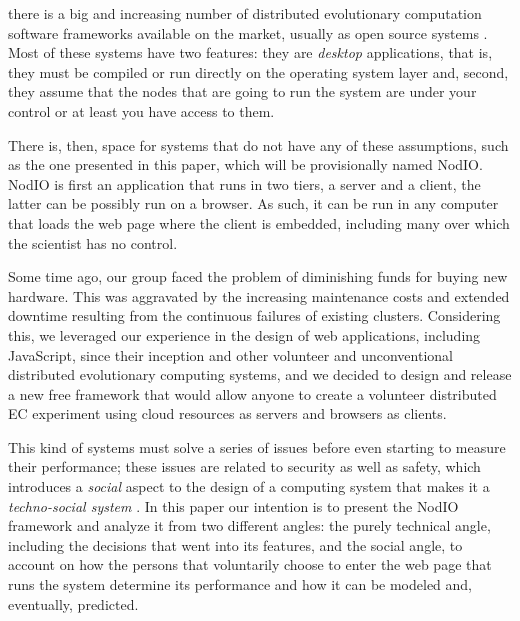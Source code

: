 \documentclass[journal,onecolumn]{IEEEtran}
\begin{document}
 there is a big and increasing number of
distributed evolutionary computation software frameworks available on
the market, usually as open source systems \cite{Parejo12Survey}. Most of these systems have %
two features: they are {\em desktop} applications, that is, they must
be compiled or run directly on the operating system layer and, second,
they assume that the nodes that are going to run the system are under
your control or at least you have access to them.

There is, then, space for systems that do not have any of these
assumptions, such as the one presented in this paper, which will be
provisionally named {\sf NodIO}. {\sf NodIO} is first an application that
runs in two tiers, a server and a client, the latter  can be possibly
run on a  %
browser. As such, it can be run in any computer that loads the web
page where the client is embedded, including many over which %
the scientist has no control.

Some time ago, our group faced the problem of diminishing funds for
buying new     %
hardware. This was aggravated by the increasing maintenance costs and
extended downtime resulting from the continuous failures of existing
clusters.
Considering this, we leveraged our experience in the design of web
applications, including JavaScript, since their inception and other
volunteer and
unconventional distributed evolutionary computing systems, and we
decided to design and release a new free framework that would allow anyone to
create a volunteer distributed EC experiment using cloud resources as
servers and browsers as clients.

This kind of systems must solve a series of issues before even starting to %
measure their performance; these issues are related to security as well as
safety, which introduces a {\em social} aspect to the design of a
computing system that makes it a {\em techno-social system}
\cite{vespignani2009predicting}. In this paper our intention is to
present the {\sf NodIO} framework and analyze it from two different
angles: the purely technical angle, including the decisions that went
into its features, and the social angle, to account on how the persons
that voluntarily choose to enter the web page that runs the system
determine its performance and how it can be modeled and, eventually,
predicted.
\end{document}
